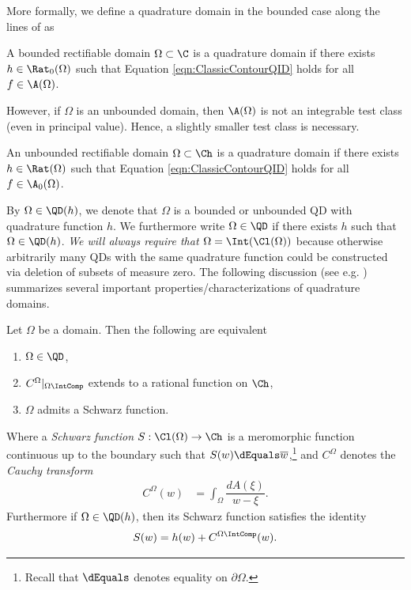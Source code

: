 \documentclass{article}
\numberwithin{equation}{section}
\begin{document}
More formally, we define a quadrature domain in the bounded case along the lines of \cite{GravenMakarov2025} as
\begin{definition}
A bounded rectifiable domain $\Omega\subset\C$ is a quadrature domain if there exists $h\in\Rat_0(\Omega)$ such that Equation \ref{eqn:ClassicContourQID} holds for all $f\in\A(\Omega)$.
\end{definition}
However, if $\Omega$ is an unbounded domain, then $\A(\Omega)$ is not an integrable test class (even in principal value). Hence, a slightly smaller test class is necessary.
\begin{definition}
An unbounded rectifiable domain $\Omega\subset\Ch$ is a quadrature domain if there exists $h\in\Rat(\Omega)$ such that Equation \ref{eqn:ClassicContourQID} holds for all $f\in\A_0(\Omega)$.
\end{definition}
By $\Omega\in\QD(h)$, we denote that $\Omega$ is a bounded or unbounded QD with quadrature function $h$. We furthermore write $\Omega\in\QD$ if there exists $h$ such that $\Omega\in\QD(h)$. \emph{We will always require that $\Omega=\Int(\Cl(\Omega))$} because otherwise arbitrarily many QDs with the same quadrature function could be constructed via deletion of subsets of measure zero. The following discussion (see e.g. \cite{GravenMakarov2025,Lee_2015}) summarizes several important properties/characterizations of quadrature domains.
\begin{lemma}\label{lemma:QDChars}
Let $\Omega$ be a domain. Then the following are equivalent
\begin{enumerate}
    \item $\Omega\in\QD$,
    \item $C^\Omega\vert_{\Omega\IntComp}$ extends to a rational function on $\Ch$,
    \item $\Omega$ admits a Schwarz function.
\end{enumerate}
\end{lemma}
Where a \emph{Schwarz function} $S:\Cl(\Omega)\rightarrow\Ch$ is a meromorphic function continuous up to the boundary such that $S(w)\dEquals\overline{w}$,\footnote{Recall that $\dEquals$ denotes equality on $\partial\Omega$.} and $C^\Omega$ denotes the \emph{Cauchy transform}
\begin{align*}
    C^{\Omega}(w)&=\int_{\Omega}\dfrac{dA(\xi)}{w-\xi}.
\end{align*}
Furthermore if $\Omega\in\QD(h)$, then its Schwarz function satisfies the identity \cite{davis_1974}
\begin{equation}\label{eqn:QuadCoincidence}
S(w)=h(w)+C^{\Omega\IntComp}(w).
\end{equation}
\end{document}
